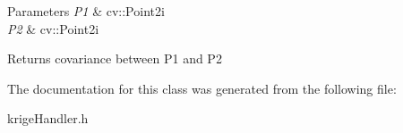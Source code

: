 \begin{DoxyParams}{Parameters}
{\em P1} & cv\+::\+Point2i \\
\hline
{\em P2} & cv\+::\+Point2i \\
\hline
\end{DoxyParams}
\begin{DoxyReturn}{Returns}
covariance between P1 and P2 
\end{DoxyReturn}


The documentation for this class was generated from the following file\+:\begin{DoxyCompactItemize}
\item 
krige\+Handler.\+h\end{DoxyCompactItemize}
